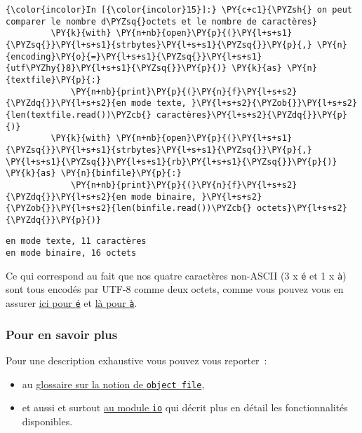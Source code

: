     \begin{Verbatim}[commandchars=\\\{\}]
{\color{incolor}In [{\color{incolor}15}]:} \PY{c+c1}{\PYZsh{} on peut comparer le nombre d\PYZsq{}octets et le nombre de caractères}
         \PY{k}{with} \PY{n+nb}{open}\PY{p}{(}\PY{l+s+s1}{\PYZsq{}}\PY{l+s+s1}{strbytes}\PY{l+s+s1}{\PYZsq{}}\PY{p}{,} \PY{n}{encoding}\PY{o}{=}\PY{l+s+s1}{\PYZsq{}}\PY{l+s+s1}{utf\PYZhy{}8}\PY{l+s+s1}{\PYZsq{}}\PY{p}{)} \PY{k}{as} \PY{n}{textfile}\PY{p}{:}
             \PY{n+nb}{print}\PY{p}{(}\PY{n}{f}\PY{l+s+s2}{\PYZdq{}}\PY{l+s+s2}{en mode texte, }\PY{l+s+s2}{\PYZob{}}\PY{l+s+s2}{len(textfile.read())\PYZcb{} caractères}\PY{l+s+s2}{\PYZdq{}}\PY{p}{)}
         \PY{k}{with} \PY{n+nb}{open}\PY{p}{(}\PY{l+s+s1}{\PYZsq{}}\PY{l+s+s1}{strbytes}\PY{l+s+s1}{\PYZsq{}}\PY{p}{,} \PY{l+s+s1}{\PYZsq{}}\PY{l+s+s1}{rb}\PY{l+s+s1}{\PYZsq{}}\PY{p}{)} \PY{k}{as} \PY{n}{binfile}\PY{p}{:}
             \PY{n+nb}{print}\PY{p}{(}\PY{n}{f}\PY{l+s+s2}{\PYZdq{}}\PY{l+s+s2}{en mode binaire, }\PY{l+s+s2}{\PYZob{}}\PY{l+s+s2}{len(binfile.read())\PYZcb{} octets}\PY{l+s+s2}{\PYZdq{}}\PY{p}{)}
\end{Verbatim}


    \begin{Verbatim}[commandchars=\\\{\}]
en mode texte, 11 caractères
en mode binaire, 16 octets

    \end{Verbatim}

    Ce qui correspond au fait que nos quatre caractères non-ASCII (3 x
\texttt{é} et 1 x \texttt{à}) sont tous encodés par UTF-8 comme deux
octets, comme vous pouvez vous en assurer
\href{https://mothereff.in/utf-8\#\%C3\%A9}{ici pour \texttt{é}} et
\href{https://mothereff.in/utf-8\#\%C3\%A0}{là pour \texttt{à}}.

    \hypertarget{pour-en-savoir-plus}{%
\subsubsection{Pour en savoir plus}\label{pour-en-savoir-plus}}

    Pour une description exhaustive vous pouvez vous reporter~:
    
\begin{itemize}
	\item 
	au \href{https://docs.python.org/3/glossary.html\#term-file-object}{glossaire
	sur la notion de \texttt{object\ file}},
	\item
	et aussi et surtout \href{https://docs.python.org/3/library/io.html\#module-io}{au module
	\texttt{io}} qui décrit plus en détail les fonctionnalités disponibles.
\end{itemize}